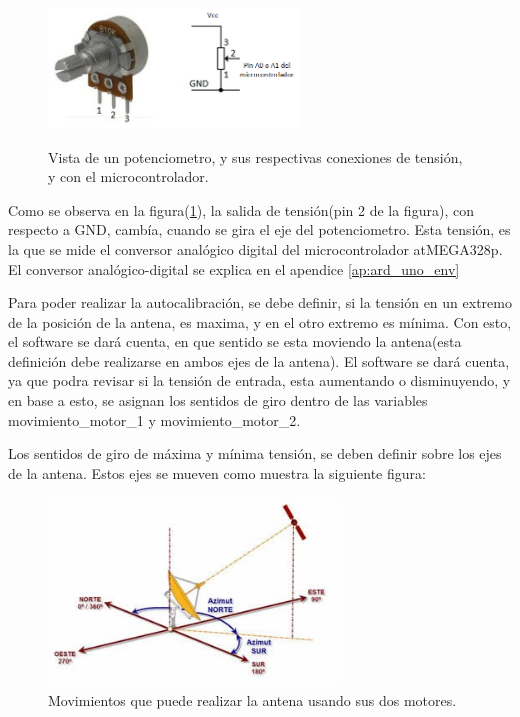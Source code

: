 \begin{figure}
	\centering
	\vspace{-20mm}
	\caption{Vista de un potenciometro, y sus respectivas conexiones de tensión, y con el microcontrolador.}	
	\includegraphics[height=3.2cm]{pote}
	\label{fig:pot}	
\end{figure}
\vspace{30mm}


Como se observa en la figura(\ref{fig:pot}), la salida de tensión(pin 2 de la figura), con respecto a GND, cambía, cuando se gira el eje del potenciometro. Esta tensión, es la que se mide el conversor analógico digital del microcontrolador atMEGA328p. El conversor analógico-digital se explica en el apendice \ref{ap:ard_uno_env}   

Para poder realizar la autocalibración, se debe definir, si la tensión en un extremo de la posición de la antena, es maxima, y en el otro extremo es mínima. Con esto, el software se dará cuenta, en que sentido se esta moviendo la antena(esta definición debe realizarse en ambos ejes de la antena). El software se dará cuenta, ya que podra revisar si la tensión de entrada, esta aumentando o disminuyendo, y en base a esto, se asignan los sentidos de giro dentro de las variables movimiento\_motor\_1 y movimiento\_motor\_2. 

Los sentidos de giro de máxima y mínima tensión, se deben definir sobre los ejes de la antena. Estos ejes se mueven como muestra la siguiente figura: 

\begin{figure}[ht]
	\centering
	\includegraphics[height=5cm]{mov_antena}
	\caption{Movimientos que puede realizar la antena usando sus dos motores.}	
\end{figure}


